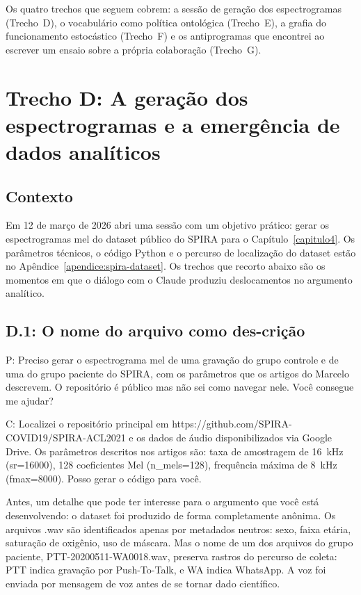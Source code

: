 Os quatro trechos que seguem cobrem: a sessão de geração dos espectrogramas (Trecho~D), o vocabulário como política ontológica (Trecho~E), a grafia do funcionamento estocástico (Trecho~F) e os antiprogramas que encontrei ao escrever um ensaio sobre a própria colaboração (Trecho~G).


\section*{Trecho D: A geração dos espectrogramas e a emergência de dados analíticos}

\subsection*{Contexto}

Em 12 de março de 2026 abri uma sessão com um objetivo prático: gerar os espectrogramas mel do dataset público do SPIRA para o Capítulo~\ref{capitulo4}. Os parâmetros técnicos, o código Python e o percurso de localização do dataset estão no Apêndice~\ref{apendice:spira-dataset}. Os trechos que recorto abaixo são os momentos em que o diálogo com o Claude produziu deslocamentos no argumento analítico.


\subsection*{D.1: O nome do arquivo como des-crição}

\begin{faladaP}
P: Preciso gerar o espectrograma mel de uma gravação do grupo controle e de uma do grupo paciente do SPIRA, com os parâmetros que os artigos do Marcelo descrevem. O repositório é público mas não sei como navegar nele. Você consegue me ajudar?
\end{faladaP}

\begin{faladaC}
C: Localizei o repositório principal em https://github.com/SPIRA-COVID19/SPIRA-ACL2021 e os dados de áudio disponibilizados via Google Drive. Os parâmetros descritos nos artigos são: taxa de amostragem de 16~kHz (sr=16000), 128 coeficientes Mel (n\_mels=128), frequência máxima de 8~kHz (fmax=8000). Posso gerar o código para você.\par\medskip Antes, um detalhe que pode ter interesse para o argumento que você está desenvolvendo: o dataset foi produzido de forma completamente anônima. Os arquivos .wav são identificados apenas por metadados neutros: sexo, faixa etária, saturação de oxigênio, uso de máscara. Mas o nome de um dos arquivos do grupo paciente, PTT-20200511-WA0018.wav, preserva rastros do percurso de coleta: PTT indica gravação por Push-To-Talk, e WA indica WhatsApp. A voz foi enviada por mensagem de voz antes de se tornar dado científico.
\end{faladaC}

